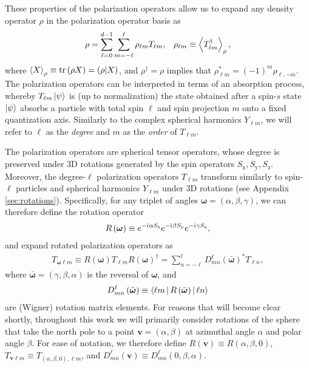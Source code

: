 \documentclass[nofootinbib,twocolumn]{revtex4-1}
\newcommand{\p}[1]{\left(#1\right)} %
\newcommand{\bk}{\Braket} %
\renewcommand{\i}{\mathrm{i}\mkern1mu} %
\newcommand{\x}{\text{x}}
\newcommand{\y}{\text{y}}
\newcommand{\z}{\text{z}}
\def\obk#1{\mathinner{({#1})}}
\begin{document}
These properties of the polarization operators allow us to expand any density operator $\rho$ in the polarization operator basis as
\begin{align}
  \rho = \sum_{\ell=0}^{d-1} \sum_{m=-\ell}^\ell
  \rho_{\ell m} T_{\ell m},
  &&
  \rho_{\ell m} \equiv \bk{T_{\ell m}^\dag}_\rho,
  \label{eq:trans_state}
\end{align}
where $\bk{X}_\rho\equiv\tr\p{\rho X}=\obk{\rho|X}$, and $\rho^\dag=\rho$ implies that $\rho_{\ell m}^*=\p{-1}^m\rho_{\ell,-m}$.
The polarization operators can be interpreted in terms of an absorption process, whereby $T_{\ell m}\ket\psi$ is (up to normalization) the state obtained after a spin-$s$ state $\ket\psi$ absorbs a particle with total spin $\ell$ and spin projection $m$ onto a fixed quantization axis.
Similarly to the complex spherical harmonics $Y_{\ell m}$, we will refer to $\ell$ as the {\it degree} and $m$ as the {\it order} of $T_{\ell m}$.

The polarization operators are spherical tensor operators, whose degree is preserved under 3D rotations generated by the spin operators $S_\x,S_\y,S_\z$.
Moreover, the degree-$\ell$ polarization operators $T_{\ell m}$ transform similarly to spin-$\ell$ particles and spherical harmonics $Y_{\ell m}$ under 3D rotations (see Appendix \ref{sec:rotations}).
Specifically, for any triplet of angles $\bm\omega=\p{\alpha,\beta,\gamma}$, we can therefore define the rotation operator
\begin{align}
  R\p{\bm\omega} \equiv e^{-\i\alpha S_\z} e^{-\i\beta S_\y} e^{-\i\gamma S_\z},
\end{align}
and expand rotated polarization operators as
\begin{align}
  T_{\bm\omega\ell m} \equiv
  R\p{\bm\omega} T_{\ell m} R\p{\bm\omega}^\dag
  = \sum_{n=-\ell}^\ell D_{mn}^\ell\p{\bar{\bm\omega}}^* T_{\ell n},
  \label{eq:trans_rot}
\end{align}
where $\bar{\bm\omega}=\p{\gamma,\beta,\alpha}$ is the reversal of $\bm\omega$, and
\begin{align}
  D_{mn}^\ell\p{\bar{\bm\omega}}
  \equiv \bk{\ell m|R\p{\bar{\bm\omega}}|\ell n}
  \label{eq:wigner_D}
\end{align}
are (Wigner) rotation matrix elements.
For reasons that will become clear shortly, throughout this work we will primarily consider rotations of the sphere that take the north pole to a point $\bm v=\p{\alpha,\beta}$ at azimuthal angle $\alpha$ and polar angle $\beta$.
For ease of notation, we therefore define $R\p{\bm v} \equiv R\p{\alpha,\beta,0}$, $T_{\bm v\ell m} \equiv T_{\p{\alpha,\beta,0},\ell m}$, and $D^\ell_{mn}\p{\bm v} \equiv D^\ell_{mn}\p{0,\beta,\alpha}$.
\end{document}
